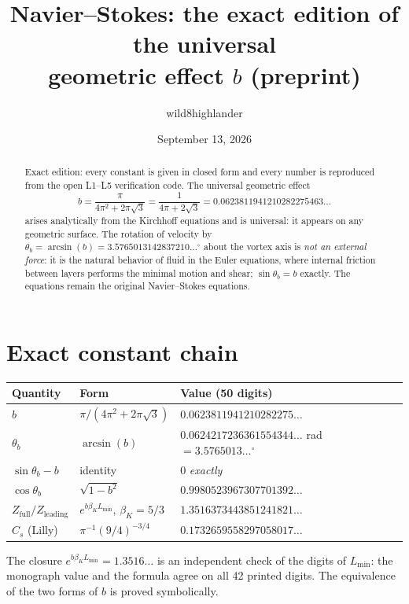\documentclass[11pt]{article}
\title{\textbf{Navier--Stokes: the exact edition of the universal\\ geometric effect $b$ (preprint)}}
\author{wild8highlander}
\date{September 13, 2026}
\begin{document}
\maketitle

\begin{abstract}
Exact edition: every constant is given in closed form and every number is
reproduced from the open L1--L5 verification code. The universal geometric
effect
\[
b=\frac{\pi}{4\pi^{2}+2\pi\sqrt3}=\frac{1}{4\pi+2\sqrt3}=0.0623811941210282275463\ldots
\]
arises analytically from the Kirchhoff equations and is universal: it appears on
any geometric surface. The rotation of velocity by
$\theta_b=\arcsin(b)=3.5765013142837210\ldots^\circ$ about the vortex axis is
\emph{not an external force}: it is the natural behavior of fluid in the Euler
equations, where internal friction between layers performs the minimal motion
and shear; $\sin\theta_b=b$ exactly. The equations remain the original
Navier--Stokes equations.
\end{abstract}

\section{Exact constant chain}

\begin{table}[h]
\centering
\begin{tabular}{lll}
\toprule
Quantity & Form & Value (50 digits) \\
\midrule
$b$ & $\pi/(4\pi^{2}+2\pi\sqrt3)$ & $0.0623811941210282275\ldots$ \\
$\theta_b$ & $\arcsin(b)$ & $0.0624217236361554344\ldots$ rad $=3.5765013\ldots^\circ$ \\
$\sin\theta_b-b$ & identity & $0$ \emph{exactly} \\
$\cos\theta_b$ & $\sqrt{1-b^{2}}$ & $0.9980523967307701392\ldots$ \\
$Z_{\mathrm{full}}/Z_{\mathrm{leading}}$ & $e^{b\beta_K L_{\min}}$, $\beta_K=5/3$ & $1.3516373443851241821\ldots$ \\
$C_s$ (Lilly) & $\pi^{-1}(9/4)^{-3/4}$ & $0.1732659558297058017\ldots$ \\
\bottomrule
\end{tabular}
\end{table}

The closure $e^{b\beta_K L_{\min}}=1.3516\ldots$ is an independent check of the
digits of $L_{\min}$: the monograph value and the formula agree on all 42
printed digits. The equivalence of the two forms of $b$ is proved symbolically.
\end{document}
